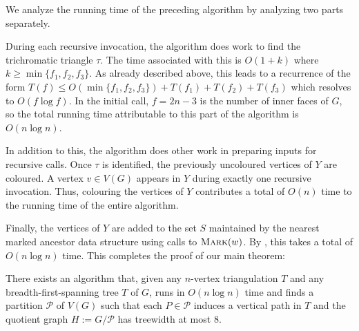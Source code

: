 \documentclass[kpfonts]{patmorin}
\let\le\leqslant
\let\ge\geqslant
\begin{document}
We analyze the running time of the preceding algorithm by analyzing two parts separately.

During each recursive invocation, the algorithm does work to find the trichromatic triangle $\tau$.  The time associated with this is $O(1+k)$ where $k\ge \min\{f_1,f_2,f_3\}$.  As already described above, this leads to a recurrence of the form $T(f) \le O(\min\{f_1,f_2,f_3\}) + T(f_1)+T(f_2)+T(f_3)$ which resolves to $O(f\log f)$.  In the initial call, $f=2n-3$ is the number of inner faces of $G$, so the total running time attributable to this part of the algorithm is $O(n\log n)$.

In addition to this, the algorithm does other work in preparing inputs for recursive calls.  Once $\tau$ is identified, the previously uncoloured vertices of $Y$ are coloured.  A vertex $v\in V(G)$ appears in $Y$ during exactly one recursive invocation. Thus, colouring the vertices of $Y$ contributes a total of $O(n)$ time to the running time of the entire algorithm.

Finally, the vertices of $Y$ are added to the set $S$ maintained by the nearest marked ancestor data structure using calls to $\textsc{Mark}(w)$.  By , this takes a total of $O(n\log n)$ time.
This completes the proof of our main theorem:

\begin{thm}
  There exists an algorithm that, given any $n$-vertex triangulation $T$ and any breadth-first-spanning tree $T$ of $G$, runs in $O(n\log n)$ time and finds a partition $\mathcal{P}$ of $V(G)$ such that each $P\in\mathcal{P}$ induces a vertical path in $T$ and the quotient graph $H:=G/\mathcal{P}$ has treewidth at most $8$.
\end{thm}
\end{document}

